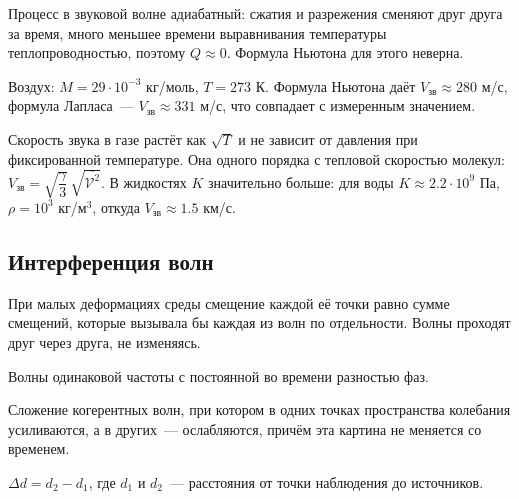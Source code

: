 \documentclass[12pt]{article}
\begin{document}
	\begin{note}
		Процесс в звуковой волне адиабатный: сжатия и разрежения сменяют друг друга за время, много меньшее времени выравнивания температуры теплопроводностью, поэтому $Q \approx 0$. Формула Ньютона для этого неверна.
	\end{note}

	\begin{example}
		Воздух: $M = 29 \cdot 10^{-3}$ кг/моль, $T = 273$ К. Формула Ньютона даёт $V_{\text{зв}} \approx 280$ м/с, формула Лапласа~--- $V_{\text{зв}} \approx 331$ м/с, что совпадает с измеренным значением.
	\end{example}

	\begin{note}
		Скорость звука в газе растёт как $\sqrt{T}$ и не зависит от давления при фиксированной температуре. Она одного порядка с тепловой скоростью молекул: $V_{\text{зв}} = \sqrt{\dfrac{\gamma}{3}}\,\sqrt{\overline{\mathcal{V}^2}}$. В жидкостях $K$ значительно больше: для воды $K \approx 2.2 \cdot 10^{9}$ Па, $\rho = 10^3$ кг/м$^3$, откуда $V_{\text{зв}} \approx 1.5$ км/с.
	\end{note}

	\subsection{Интерференция волн}

	\begin{statement}
		При малых деформациях среды смещение каждой её точки равно сумме смещений, которые вызывала бы каждая из волн по отдельности. Волны проходят друг через друга, не изменяясь.
	\end{statement}

	\begin{definition}
		Волны одинаковой частоты с постоянной во времени разностью фаз.
	\end{definition}

	\begin{definition}
		Сложение когерентных волн, при котором в одних точках пространства колебания усиливаются, а в других~--- ослабляются, причём эта картина не меняется со временем.
	\end{definition}

	\begin{definition}
		$\varDelta d = d_2 - d_1$, где $d_1$ и $d_2$~--- расстояния от точки наблюдения до источников.
	\end{definition}
\end{document}
